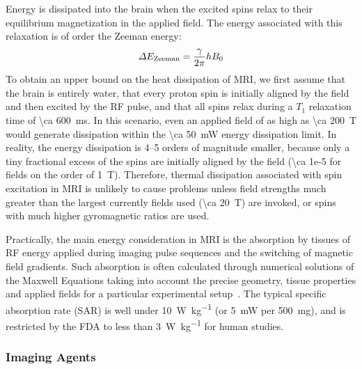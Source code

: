 Energy is dissipated into the brain when the excited spins relax to their equilibrium magnetization in the applied field.
The energy associated with this relaxation is of order the Zeeman energy:
\[\Delta E_{\text{\scriptsize Zeeman}} = \frac{\gamma}{2\pi} h B_0\]
To obtain an upper bound on the heat dissipation of MRI, we first assume that the brain is entirely water, that every proton spin is initially aligned by the field and then excited by the RF pulse, and that all spins relax during a $T_1$ relaxation time of \SI{\ca 600}{\ms}.
In this scenario, even an applied field of as high as \SI{\ca 200}{\tesla} would generate dissipation within the \SI{\ca 50}{\milli\watt} energy dissipation limit.
In reality, the energy dissipation is 4--5 orders of magnitude smaller, because only a tiny fractional excess of the spins are initially aligned by the field (\num{\ca 1e-5} for fields on the order of \SI{1}{\tesla}).
Therefore, thermal dissipation associated with spin excitation in MRI is unlikely to cause problems unless field strengths much greater than the largest currently fields used (\SI{\ca 20}{\tesla}) are invoked, or spins with much higher gyromagnetic ratios are used.

Practically, the main energy consideration in MRI is the absorption by tissues of RF energy applied during imaging pulse sequences and the switching of magnetic field gradients.
Such absorption is often calculated through numerical solutions of the Maxwell Equations taking into account the precise geometry, tissue properties and applied fields for a particular experimental setup~\cite{collins04}.
The typical specific absorption rate (SAR) is well under \SI{10}{\watt\per\kilogram} (or \SI{5}{\milli\watt} per \SI{500}{\milli\gram}), and is restricted by the FDA to less than \SI{3}{\watt\per\kilogram} for human studies.

\subsubsection{Imaging Agents}

